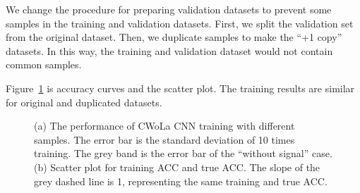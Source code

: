 \documentclass[12pt]{article}
\begin{document}
        We change the procedure for preparing validation datasets to prevent some samples in the training and validation datasets. First, we split the validation set from the original dataset. Then, we duplicate samples to make the ``+1 copy'' datasets. In this way, the training and validation dataset would not contain common samples.

        Figure~\ref{fig:acc_curve_split_validation_first} is accuracy curves and the scatter plot. The training results are similar for original and duplicated datasets.
        \begin{figure}[htpb]
            \centering
            \caption{(a) The performance of CWoLa CNN training with different samples. The error bar is the standard deviation of 10 times training. The grey band is the error bar of the ``without signal'' case. (b) Scatter plot for training ACC and true ACC. The slope of the grey dashed line is 1, representing the same training and true ACC.}
            \label{fig:acc_curve_split_validation_first}
        \end{figure}
        
\end{document}
